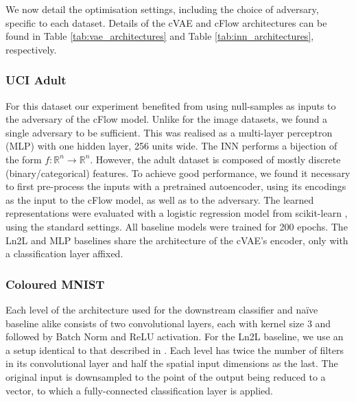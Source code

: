 We now detail the optimisation settings, including the choice of adversary, specific to each dataset. Details of the cVAE and cFlow architectures can be found in Table \ref{tab:vae_architectures} and Table \ref{tab:inn_architectures}, respectively.

\subsubsection{UCI Adult} 
For this dataset our experiment benefited from using null-samples as inputs to the adversary of the cFlow model. Unlike for the image datasets, we found a single adversary to be sufficient. This was realised as a multi-layer perceptron (MLP) with one hidden layer, 256 units wide. The INN performs a bijection of the form $f: \mathbb{R}^n \rightarrow \mathbb{R}^n$. However, the adult dataset is composed of mostly discrete (binary/categorical) features. To achieve good performance, we found it necessary to first pre-process the inputs with a pretrained autoencoder, using its encodings as the input to the cFlow model, as well as to the adversary. The learned representations were evaluated with a logistic regression model from scikit-learn \cite{scikit-learn}, using the standard settings. All baseline models were trained for 200 epochs.
The Ln2L \cite{ln2l} and MLP baselines share the architecture of the cVAE's encoder, only with a classification layer affixed.

\subsubsection{Coloured MNIST}
Each level of the architecture used for the downstream classifier and na\"ive baseline alike consists of two convolutional layers, each with kernel size 3 and followed by Batch Norm \cite{ioffe2015batch} and ReLU activation. For the Ln2L baseline, we use an a setup identical to that described in \cite{ln2l}. Each level has twice the number of filters in its convolutional layer and half the spatial input dimensions as the last. The original input is downsampled to the point of the output being reduced to a vector, to which a fully-connected classification layer is applied.

